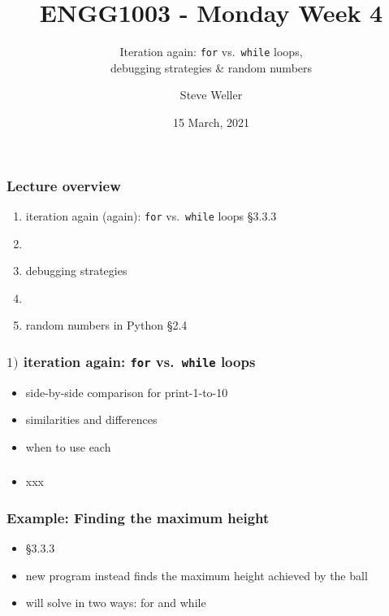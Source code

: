 \documentclass[14pt]{beamer}
\title{ENGG1003 - Monday Week 4}
\subtitle{Iteration again: \texttt{for} vs.~\texttt{while} loops, \\ debugging strategies \& random numbers}
\author{Steve Weller}
\institute{University of Newcastle}
\date{15 March, 2021}
\newcommand\red[1]{{\color{red} #1}}
\begin{document}
\framebreak


\begin{frame}[fragile]

\frametitle{Lecture overview}
\begin{enumerate}
	\item iteration again (again): \texttt{for} vs.~\texttt{while} loops \red{\S3.3.3}

	\item[]
	
	\item debugging strategies
	
	\item[]
	
	\item random numbers in Python \red{\S2.4}

\end{enumerate}

\end{frame}


\begin{frame}[fragile]

\frametitle{$1)$ iteration again: \texttt{for} vs.~\texttt{while} loops}

\begin{itemize}
	\item side-by-side comparison for print-1-to-10
	\item similarities and differences
	\item when to use each
\end{itemize}

\end{frame}


\begin{frame}[fragile]

\frametitle{}

\begin{itemize}
	\item xxx
\end{itemize}

\end{frame}


\begin{frame}[fragile]

\frametitle{Example: Finding the maximum height}

\begin{itemize}
	\item \S3.3.3
	\item new program instead finds the maximum height achieved by the ball
	\item will solve in two ways: for and while
\end{itemize}

\end{frame}
\end{document}
